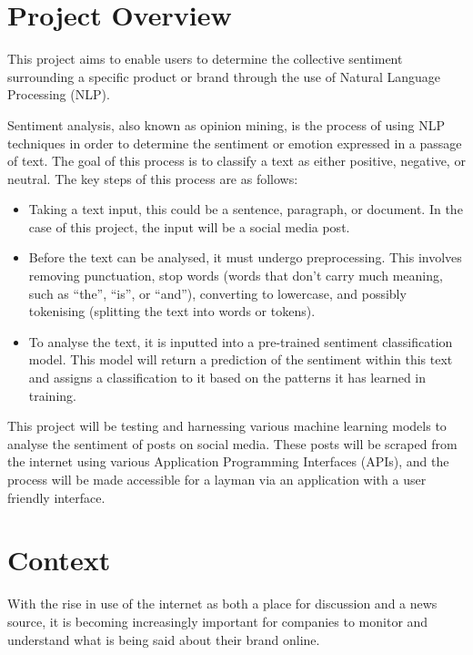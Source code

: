 \section{Project Overview}
This project aims to enable users to determine the collective sentiment surrounding a specific product or brand through the use of Natural Language Processing (NLP).

Sentiment analysis, also known as opinion mining, is the process of using NLP techniques in order to determine the sentiment or emotion expressed in a passage of text. The goal of this process is to classify a text as either positive, negative, or neutral. The key steps of this process are as follows:
\begin{itemize}
    \item Taking a text input, this could be a sentence, paragraph, or document. In the case of this project, the input will be a social media post.
    \item Before the text can be analysed, it must undergo preprocessing. This involves removing punctuation, stop words (words that don't carry much meaning, such as ``the'', ``is'', or ``and''), converting to lowercase, and possibly tokenising (splitting the text into words or tokens).
    \item To analyse the text, it is inputted into a pre-trained sentiment classification model. This model will return a prediction of the sentiment within this text and assigns a classification to it based on the patterns it has learned in training.
\end{itemize}

This project will be testing and harnessing various machine learning models to analyse the sentiment of posts on social media. These posts will be scraped from the internet using various Application Programming Interfaces (APIs), and the process will be made accessible for a layman via an application with a user friendly interface.

\section{Context}
With the rise in use of the internet as both a place for discussion and a news source, it is becoming increasingly important for companies to monitor and understand what is being said about their brand online.

